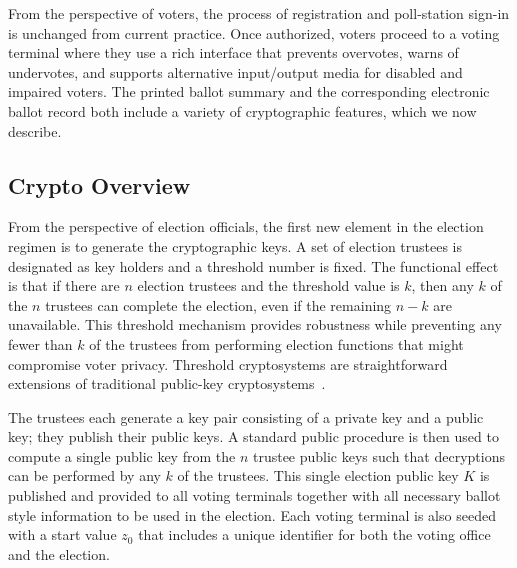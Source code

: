 \label{sec:design}

From the perspective of voters, the process of registration and poll-station sign-in is unchanged from current practice.  Once authorized, voters proceed to a voting terminal where they use a rich interface that prevents overvotes, warns of undervotes, and supports alternative input/output media for disabled and impaired voters. The printed ballot summary and the corresponding electronic ballot record both include a variety of cryptographic features, which we now describe.




\subsection{Crypto Overview}
From the perspective of election officials, the first new element in the election regimen is 
to generate the cryptographic keys.  
A set of election trustees is designated as key holders and a threshold number is fixed.  
The functional effect is that if there are $n$ election trustees and the threshold value is $k$, then any $k$ of the $n$ trustees can complete the election, even if the remaining $n-k$ are unavailable.  This threshold mechanism provides robustness while preventing any fewer than $k$ of the trustees from performing election functions that might compromise voter privacy. 
Threshold cryptosystems are straightforward extensions of traditional public-key cryptosystems~\cite{desmedt90threshold}.

The trustees each generate a key pair consisting of a private key and
a public key; they publish their public keys.  
A standard public
procedure is then used to compute a single public key from the $n$
trustee public keys such that decryptions can be performed by any $k$
of the trustees.  This single election public key $K$ is published and
provided to all voting terminals together with all necessary
ballot style information to be used in the election.  
Each voting terminal is also seeded with a start value $z_0$ that includes a
unique identifier for both the voting office and the election.


